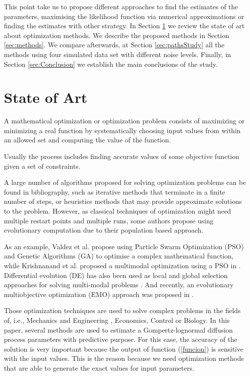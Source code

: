 \documentclass{sig-alternate}
\begin{document}
This point take us to propose different approaches to find the estimates of the parameters, maximising the likelihood function via numerical approximations or finding the estimates with other strategy. In Section \ref{sec:soa} we review the state of art about optimization methods. We describe the proposed methods in Section \ref{sec:methods}. We compare afterwards, at Section \ref{sec:pathsStudy} all the methods using four simulated data set with different noise levels. Finally, in Section \ref{sec:Conclusion} we establish the main conclusions of the study.

\section{State of Art}
\label{sec:soa}

A mathematical optimization or optimization problem \cite{Minoux1986} consists of maximizing or minimizing a real function by systematically choosing input values from within an allowed set and computing the value of the function. 

Usually the process includes finding accurate values of some objective function given a set of constraints.


A large number of algorithms proposed for solving optimization problems can be found in bibliography, such as iterative methods that terminate in a finite number of steps, or heuristics methods that may provide approximate solutions to the problem.
However, as classical techniques of optimization might need multiple restart points and multiple runs, some authors propose using evolutionary computation \cite{Pattnaik2001} due to their population based approach.

As an example, Valdez et al. \cite{Valdez2007,Valdez2007b,Valdez2008} propose using Particle Swarm Optimization (PSO) and Genetic Algorithms (GA) to optimise a complex mathematical function, while Krishnanand et al. proposed a multimodal optimization using a PSO in \cite{Krishnanand2009}. Differential evolution (DE) has also been used as local and global selection approaches for solving multi-modal problems \cite{Ronkkonen2009}. And recently, an evolutionary multiobjective optimization (EMO) approach was proposed in \cite{Deb2010,Saha2010}.

Those optimization techniques are used to solve complex problems in the fields of, i.e., Mechanics and Engineering \cite{Tabucanon1996}, Economics, Control or Biology.
In this paper, several methods are used to estimate a Gompertz-lognormal diffusion process parameters with predictive purpose. For this case, the accuracy of the solution is very important because the output of function (\ref{funcion}) is sensitive with the input values. This is the reason because we need optimization methods that are able to generate the exact values for input parameters.   
\end{document}
